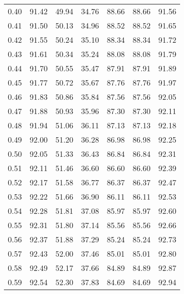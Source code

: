 \begin{tabular}{|c|c|c|c|c|c|c|}
      0.40 &     91.42 &     49.94 &      34.76 &   88.66 &      88.66 &         91.56 \\
      0.41 &     91.50 &     50.13 &      34.96 &   88.52 &      88.52 &         91.65 \\
      0.42 &     91.55 &     50.24 &      35.10 &   88.34 &      88.34 &         91.72 \\
      0.43 &     91.61 &     50.34 &      35.24 &   88.08 &      88.08 &         91.79 \\
      0.44 &     91.70 &     50.55 &      35.47 &   87.91 &      87.91 &         91.89 \\
      0.45 &     91.77 &     50.72 &      35.67 &   87.76 &      87.76 &         91.97 \\
      0.46 &     91.83 &     50.86 &      35.84 &   87.56 &      87.56 &         92.05 \\
      0.47 &     91.88 &     50.93 &      35.96 &   87.30 &      87.30 &         92.11 \\
      0.48 &     91.94 &     51.06 &      36.11 &   87.13 &      87.13 &         92.18 \\
      0.49 &     92.00 &     51.20 &      36.28 &   86.98 &      86.98 &         92.25 \\
      0.50 &     92.05 &     51.33 &      36.43 &   86.84 &      86.84 &         92.31 \\
      0.51 &     92.11 &     51.46 &      36.60 &   86.60 &      86.60 &         92.39 \\
      0.52 &     92.17 &     51.58 &      36.77 &   86.37 &      86.37 &         92.47 \\
      0.53 &     92.22 &     51.66 &      36.90 &   86.11 &      86.11 &         92.53 \\
      0.54 &     92.28 &     51.81 &      37.08 &   85.97 &      85.97 &         92.60 \\
      0.55 &     92.31 &     51.80 &      37.14 &   85.56 &      85.56 &         92.66 \\
      0.56 &     92.37 &     51.88 &      37.29 &   85.24 &      85.24 &         92.73 \\
      0.57 &     92.43 &     52.00 &      37.46 &   85.01 &      85.01 &         92.80 \\
      0.58 &     92.49 &     52.17 &      37.66 &   84.89 &      84.89 &         92.87 \\
      0.59 &     92.54 &     52.30 &      37.83 &   84.69 &      84.69 &         92.94 \\

\end{tabular}
